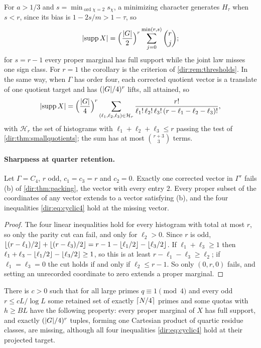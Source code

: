 For $a>1/3$ and $s=\min_{\operatorname{ord}\chi=2}s_\chi$, a minimizing character generates $H_\tau$ when
$s<r$, since its bias is $1-2s/m>1-\tau$, so
\[
 \lvert\operatorname{supp} X\rvert=\Bigl(\frac{\lvert G\rvert}2\Bigr)^r\sum_{j=0}^{\min(r,s)}\binom rj ;
\]
for $s=r-1$ every proper marginal has full support while the joint law misses one sign class. For
$r=1$ the corollary is the criterion of \cref{dir:rem:thresholds}. In the same way, when $\Gamma$ has order
four, each corrected quotient vector is a translate of one quotient target and has $(\lvert G\rvert/4)^r$ lifts, all
attained, so
\[
 \lvert\operatorname{supp} X\rvert=\Bigl(\frac{\lvert G\rvert}4\Bigr)^r\sum_{(\ell_1,\ell_2,\ell_3)\in\mathcal H_r}
 \frac{r!}{\ell_1!\,\ell_2!\,\ell_3!\,(r-\ell_1-\ell_2-\ell_3)!},
\]
with $\mathcal H_r$ the set of histograms with $\ell_1+\ell_2+\ell_3\le r$ passing the test of
\cref{dir:thm:smallquotients}; the sum has at most $\binom{r+3}3$ terms.

\paragraph{Sharpness at quarter retention.}
\begin{proposition}\label{dir:prop:missing}
Let $\Gamma=C_4$, $r$ odd, $c_1=c_3=r$ and $c_2=0$. Exactly one corrected vector in $\Gamma^r$ fails
\textup{(b)} of \cref{dir:thm:packing}, the vector with every entry $2$. Every proper subset of the
coordinates of any vector extends to a vector satisfying \textup{(b)}, and the four inequalities
\eqref{dir:eq:cyclic4} hold at the missing vector.
\end{proposition}

\begin{proof}
The four linear inequalities hold for every histogram with total at most $r$, so only the parity cut can fail,
and only for $\ell_2>0$. Since $r$ is odd,
$\lfloor(r-\ell_1)/2\rfloor+\lfloor(r-\ell_3)/2\rfloor=r-1-\lfloor\ell_1/2\rfloor-\lfloor\ell_3/2\rfloor$. If $\ell_1+\ell_3\ge1$ then
$\ell_1+\ell_3-\lfloor\ell_1/2\rfloor-\lfloor\ell_3/2\rfloor\ge1$, so this is at least $r-\ell_1-\ell_3\ge\ell_2$; if
$\ell_1=\ell_3=0$ the cut holds if and only if $\ell_2\le r-1$. So only $(0,r,0)$ fails, and setting an
unrecorded coordinate to zero extends a proper marginal.
\end{proof}

\begin{corollary}\label{dir:cor:paritycut}
There is $c>0$ such that for all large primes $q\equiv1\pmod4$ and every odd $r\le cL/\log L$ some retained set
of exactly $\lceil N/4\rceil$ primes and some quotas with $h\ge BL$ have the following property: every proper
marginal of $X$ has full support, and exactly $(\lvert G\rvert/4)^r$ tuples, forming one Cartesian product of quartic
residue classes, are missing, although all four inequalities \eqref{dir:eq:cyclic4} hold at their projected
target.
\end{corollary}


